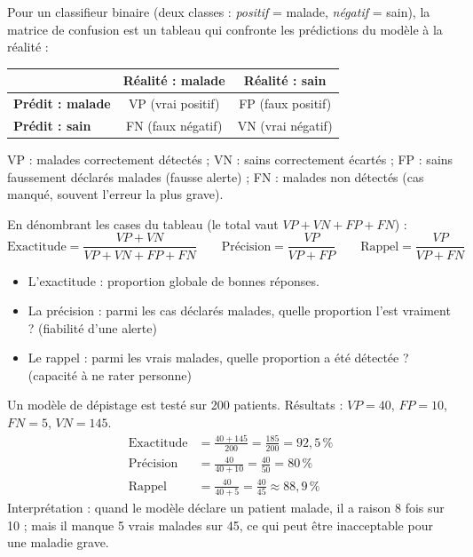 \documentclass[11pt]{article}
\newcommand{\cle}[1]{{\popxbold\color{popdark}#1}}
\begin{document}
\begin{definition}
Pour un classifieur binaire (deux classes : \emph{positif} = malade, \emph{négatif} = sain), la \cle{matrice de confusion} est un tableau qui confronte les prédictions du modèle à la réalité :
\begin{center}
\begin{tabular}{l|c|c}
 & \textbf{Réalité : malade} & \textbf{Réalité : sain} \\
\hline
\textbf{Prédit : malade} & VP (vrai positif) & FP (faux positif) \\
\hline
\textbf{Prédit : sain} & FN (faux négatif) & VN (vrai négatif) \\
\end{tabular}
\end{center}
VP : malades correctement détectés ; VN : sains correctement écartés ; FP : sains faussement déclarés malades (fausse alerte) ; FN : malades non détectés (cas manqué, souvent l'erreur la plus grave).
\end{definition}

\begin{propriete}
En dénombrant les cases du tableau (le total vaut $VP + VN + FP + FN$) :
\[ \text{Exactitude} = \frac{VP + VN}{VP + VN + FP + FN} \qquad
\text{Précision} = \frac{VP}{VP + FP} \qquad
\text{Rappel} = \frac{VP}{VP + FN} \]
\begin{itemize}
  \item L'\cle{exactitude} : proportion globale de bonnes réponses.
  \item La \cle{précision} : parmi les cas déclarés malades, quelle proportion l'est vraiment ? (fiabilité d'une alerte)
  \item Le \cle{rappel} : parmi les vrais malades, quelle proportion a été détectée ? (capacité à ne rater personne)
\end{itemize}
\end{propriete}

\begin{exemplebox}
Un modèle de dépistage est testé sur 200 patients. Résultats : $VP = 40$, $FP = 10$, $FN = 5$, $VN = 145$.
\begin{align*}
\text{Exactitude} &= \frac{40 + 145}{200} = \frac{185}{200} = 92{,}5\,\% \\
\text{Précision} &= \frac{40}{40 + 10} = \frac{40}{50} = 80\,\% \\
\text{Rappel} &= \frac{40}{40 + 5} = \frac{40}{45} \approx 88{,}9\,\%
\end{align*}
Interprétation : quand le modèle déclare un patient malade, il a raison 8 fois sur 10 ; mais il manque 5 vrais malades sur 45, ce qui peut être inacceptable pour une maladie grave.
\end{exemplebox}
\end{document}
